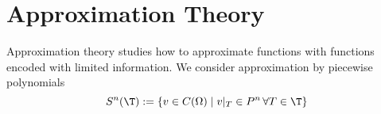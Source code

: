 
\chapter{Approximation Theory}
Approximation theory studies how to approximate functions with functions encoded with limited information.
We consider approximation by piecewise polynomials
\begin{equation*}
  S^n(\T) := \{ v \in C(\Omega)\mid v|_{T} \in P^n \, \forall T \in \T \}
\end{equation*}

